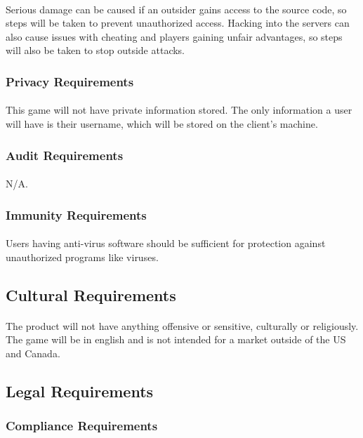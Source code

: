 \documentclass[12pt, titlepage]{article}
\begin{document}
\paragraph{}Serious damage can be caused if an outsider gains access to the source code, so steps will be taken to prevent unauthorized access. Hacking into the servers can also cause issues with cheating and players gaining unfair advantages, so steps will also be taken to stop outside attacks. 
\subsubsection{Privacy Requirements}
\paragraph{}This game will not have private information stored. The only information a user will have is their username, which will be stored on the client's machine.
\subsubsection{Audit Requirements}
\paragraph{}N/A.
\subsubsection{Immunity Requirements}
\paragraph{}Users having anti-virus software should be sufficient for protection against unauthorized programs like viruses.
\subsection{Cultural Requirements}
\paragraph{}The product will not have anything offensive or sensitive, culturally or religiously. The game will be in english and is not intended for a market outside of the US and Canada.
\subsection{Legal Requirements}
\subsubsection{Compliance Requirements}
\end{document}

